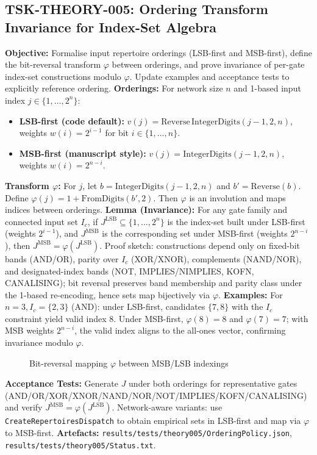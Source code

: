 \documentclass[11pt]{article}
\begin{document}
\subsection{TSK-THEORY-005: Ordering Transform Invariance for Index-Set Algebra}
\textbf{Objective:} Formalise input repertoire orderings (LSB-first and MSB-first), define the bit-reversal transform \(\varphi\) between orderings, and prove invariance of per-gate index-set constructions modulo \(\varphi\). Update examples and acceptance tests to explicitly reference ordering.
\textbf{Orderings:} For network size \(n\) and 1-based input index \(j\in\{1,\dots,2^n\}\):
\begin{itemize}
 \item \textbf{LSB-first (code default):} \(v(j)=\mathrm{Reverse}\,\mathrm{IntegerDigits}(j-1,2,n)\), weights \(w(i)=2^{i-1}\) for bit \(i\in\{1,\dots,n\}\).
 \item \textbf{MSB-first (manuscript style):} \(v(j)=\mathrm{IntegerDigits}(j-1,2,n)\), weights \(w(i)=2^{n-i}\).
\end{itemize}
\textbf{Transform \(\varphi\):} For \(j\), let \(b=\mathrm{IntegerDigits}(j-1,2,n)\) and \(b'=\mathrm{Reverse}(b)\). Define \(\varphi(j)=1+\mathrm{FromDigits}(b',2)\). Then \(\varphi\) is an involution and maps indices between orderings.
\textbf{Lemma (Invariance):} For any gate family and connected input set \(I_c\), if \(J^{\mathrm{LSB}}\subseteq\{1,\dots,2^n\}\) is the index-set built under LSB-first (weights \(2^{i-1}\)), and \(J^{\mathrm{MSB}}\) is the corresponding set under MSB-first (weights \(2^{n-i}\)), then \(J^{\mathrm{MSB}}=\varphi(J^{\mathrm{LSB}})\). Proof sketch: constructions depend only on fixed-bit bands (AND/OR), parity over \(I_c\) (XOR/XNOR), complements (NAND/NOR), and designated-index bands (NOT, IMPLIES/NIMPLIES, KOFN, CANALISING); bit reversal preserves band membership and parity class under the 1-based re-encoding, hence sets map bijectively via \(\varphi\).
\textbf{Examples:} For \(n=3, I_c=\{2,3\}\) (AND): under LSB-first, candidates \(\{7,8\}\) with the \(I_c\) constraint yield valid index \(8\). Under MSB-first, \(\varphi(8)=8\) and \(\varphi(7)=7\); with MSB weights \(2^{n-i}\), the valid index aligns to the all-ones vector, confirming invariance modulo \(\varphi\).
\begin{figure}[h]
\centering
{}
\caption{Bit-reversal mapping \(\varphi\) between MSB/LSB indexings}
\end{figure}
\textbf{Acceptance Tests:} Generate \(J\) under both orderings for representative gates (AND/OR/XOR/XNOR/NAND/NOR/NOT/IMPLIES/KOFN/CANALISING) and verify \(J^{\mathrm{MSB}}=\varphi(J^{\mathrm{LSB}})\). Network-aware variants: use \texttt{CreateRepertoiresDispatch} to obtain empirical sets in LSB-first and map via \(\varphi\) to MSB-first.
\textbf{Artefacts:} \texttt{results/tests/theory005/OrderingPolicy.json}, \texttt{results/tests/theory005/Status.txt}.
\end{document}
